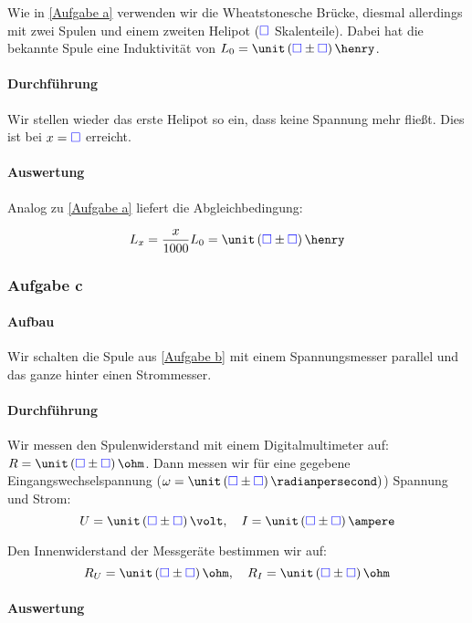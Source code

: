 \documentclass[11pt, ngerman]{article}
\newcommand{\emesswert}{\left(\messwert \pm \messwert \right)}
\newcommand{\messwert}{\textcolor{blue}{\square}}
\begin{document}
Wie in \ref{Aufgabe a} verwenden wir die Wheatstonesche Brücke, diesmal
allerdings mit zwei Spulen und einem zweiten Helipot ($\messwert$ Skalenteile).
Dabei hat die bekannte Spule eine Induktivität von $L_0 = \unit \emesswert
\henry$.

\paragraph{Durchführung}

Wir stellen wieder das erste Helipot so ein, dass keine Spannung mehr fließt.
Dies ist bei $x = \messwert$ erreicht.

\paragraph{Auswertung}

Analog zu \ref{Aufgabe a} liefert die Abgleichbedingung:

\begin{equation}
	\label{eq:b}
	L_x = \frac{x}{1000} L_0 = \unit \emesswert \henry
\end{equation}

\subsubsection{Aufgabe c}

\label{Aufgabe c}

\paragraph{Aufbau}

Wir schalten die Spule aus \ref{Aufgabe b} mit einem Spannungsmesser parallel
und das ganze hinter einen Strommesser.

\paragraph{Durchführung}

Wir messen den Spulenwiderstand mit einem Digitalmultimeter auf: $R = \unit
\emesswert \ohm$. Dann messen wir für eine gegebene Eingangswechselspannung
($\omega = \unit \emesswert \radianpersecond)$) Spannung und Strom:
\[
	U = \unit \emesswert \volt
	, \quad
	I = \unit \emesswert \ampere
\]

Den Innenwiderstand der Messgeräte bestimmen wir auf:
\[
	R_U = \unit \emesswert \ohm
	, \quad
	R_I = \unit \emesswert \ohm
\]

\paragraph{Auswertung}
\end{document}
